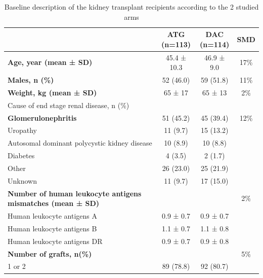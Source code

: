 \documentclass{article}
\begin{document}
\begin{center}
\begin{table}[!ht]%
\scriptsize
\caption{Baseline description of the kidney transplant recipients according to the 2 studied arms\label{tabS3}}
\begin{tabular*}{\textwidth}{@{\extracolsep\fill}lccc@{}}
\toprule
\textbf{} &  \makecell{\textbf{ATG} \\ \textbf{(n=113)}}  & \makecell{\textbf{DAC} \\ \textbf{(n=114)}} & \textbf{SMD}   \\ \hline
\textbf{Age, year (mean ± SD)} & 45.4 ± 10.3 & 46.9 ± 9.0 & 17\% \\
\textbf{Males, n (\%)} & 52 (46.0) & 59 (51.8) & 11\% \\
\textbf{Weight, kg (mean ± SD)} & 65 ± 17 & 65 ± 13 & 2\%  \\
Cause of end stage renal disease, n (\%) & & & \\
\hspace{5mm}\textbf{Glomerulonephritis} & 51 (45.2) & 45 (39.4)  & 12\%  \\
\hspace{5mm}Uropathy & 11 (9.7) & 15 (13.2) & \\
\hspace{5mm}Autosomal dominant polycystic kidney disease & 10 (8.9) & 10 (8.8) & \\
\hspace{5mm}Diabetes & 4 (3.5) & 2 (1.7) & \\
\hspace{5mm}Other & 26 (23.0) & 25 (21.9) & \\
\hspace{5mm}Unknown & 11 (9.7) & 17 (15.0) & \\
\textbf{Number of human leukocyte antigens mismatches (mean ± SD)}  & & & 2\% \\
\hspace{5mm}Human leukocyte antigens A & 0.9 ± 0.7 & 0.9 ± 0.7 & \\
\hspace{5mm}Human leukocyte antigens B & 1.1 ± 0.7 & 1.1 ± 0.8 & \\
\hspace{5mm}Human leukocyte antigens DR & 0.9 ± 0.7 & 0.9 ± 0.8&  \\
\textbf{Number of grafts, n(\%)} & & & 5\% \\
\hspace{5mm} 1 or 2 & 89 (78.8) & 92 (80.7)  & \\

\end{tabular*}
\end{table}
\end{center}
\end{document}
